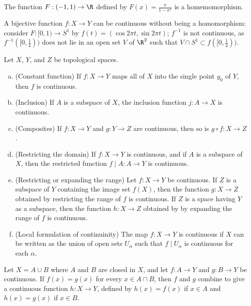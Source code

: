 \begin{eg}
The function $F: (-1, 1) \rightarrow \R$ defined by $F(x) = \frac{x}{1-x^2}$ is a homemomorphism.
\end{eg}

\begin{remark}
A bijective function $f \colon X \rightarrow Y$ can be continuous without being a homomorphism: consider $F: [0, 1) \rightarrow S^1$ by $f(t) = (\cos 2\pi t, \sin 2\pi  t)$;
$f^{-1}$ is not continuous, as $f^{-1}([0, \frac{1}{4}))$ does not lie in an open set $V$ of $\R^2$ such that $V \cap S^1 \subset f([0, \frac{1}{4}))$.
\end{remark}

\begin{theorem}
Let $X$, $Y$, and $Z$ be topological spaces. 
\begin{enumerate}[a)]
    \item (Constant function) If $f \colon X \rightarrow Y$ maps all of $X$ into the single point $y_0$ of $Y$, then $f$ is continuous.
    \item (Inclusion) If $A$ is a subspace of $X$, the inclusion function $j \colon A \rightarrow X$ is continuous. 
    \item (Composites) If $f \colon X \rightarrow Y$ and $g \colon Y \rightarrow Z$ are continuous, then so is $g \circ f : X \rightarrow Z$.
    \item (Restricting the domain) If $f \colon X \rightarrow Y$ is continuous, and if $A$ is a subspace of $X$, then the restricted function $f \mid A \colon A \rightarrow Y$ is continuous.
    \item (Restricting or expanding the range) Let $f \colon X \rightarrow Y$ be continuous. If $Z$ is a subspace of $Y$ containing the image set $f(X)$, then the function
    $g \colon X \rightarrow Z$ obtained by restricting the range of $f$ is continuous. If $Z$ is a space having $Y$ as a subspace, then the function $h \colon X \rightarrow Z$ obtained by
    by expanding the range of $f$ is continuous.
    \item (Local formulation of continuinity) The map $f \colon X \rightarrow Y$ is continuous if $X$ can be written as the union of open sets $U_\alpha$ such that $f \mid U_\alpha$ is continuous for each $\alpha$.
\end{enumerate}
\end{theorem}

\begin{theorem}
Let $X = A \cup B$ where $A$ and $B$ are closed in $X$, and let $f \colon A \rightarrow Y$ and $g \colon B \rightarrow Y$ be continuous. 
If $f(x) = g(x)$ for every $x \in A \cap B$, then $f$ and $g$ combine to give a continuous function $h\colon X \rightarrow Y$, defined by
$h(x) = f(x)$ if $x \in A$ and $h(x) = g(x)$ if $x \in B$.
\end{theorem}

